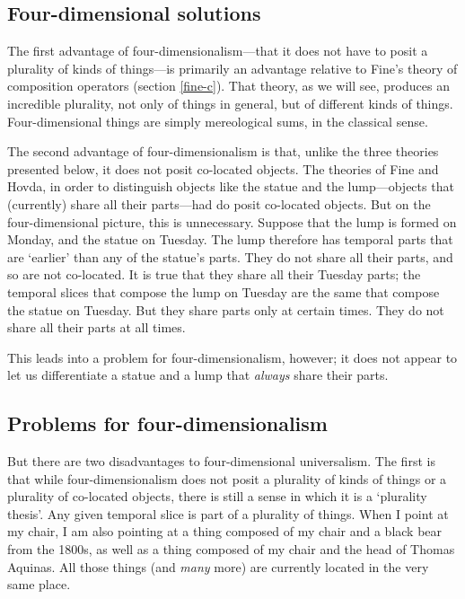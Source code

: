\documentclass[11pt]{article}
\begin{document}
\begin{spacing}{1.5}
\subsection{Four-dimensional solutions}
\label{4ds}
The first advantage of four-dimensionalism---that it does not have to
posit a plurality of kinds of things---is primarily an advantage
relative to Fine's theory of composition operators (section
\ref{fine-c}).  That theory, as we will see, produces an incredible
plurality, not only of things in general, but of different kinds of
things.  Four-dimensional things are simply mereological sums, in the
classical sense.

The second advantage of four-dimensionalism is that, unlike the three
theories presented below, it does not posit co-located objects.  The
theories of Fine and Hovda, in order to distinguish objects like the
statue and the lump---objects that (currently) share all their
parts---had do posit co-located objects.  But on the four-dimensional
picture, this is unnecessary.  Suppose that the lump is formed on
Monday, and the statue on Tuesday.  The lump therefore has temporal
parts that are `earlier' than any of the statue's parts.  They do not
share all their parts, and so are not co-located.  It is true that
they share all their Tuesday parts; the temporal slices that compose
the lump on Tuesday are the same that compose the statue on Tuesday.
But they share parts only at certain times.  They do not share all
their parts at all times.  

This leads into a problem for four-dimensionalism, however; it does
not appear to let us differentiate a statue and a lump that {\em
  always} share their parts.

\subsection{Problems for four-dimensionalism}
\label{4dp}
But there are two disadvantages to four-dimensional universalism.  The
first is that while four-dimensionalism does not posit a plurality of
kinds of things or a plurality of co-located objects, there is still a
sense in which it is a `plurality thesis'.  Any given temporal slice
is part of a plurality of things.  When I point at my chair, I am also
pointing at a thing composed of my chair and a black bear from the
1800s, as well as a thing composed of my chair and the head of Thomas
Aquinas.  All those things (and {\em many} more) are currently located
in the very same place.


\end{spacing}
\end{document}
